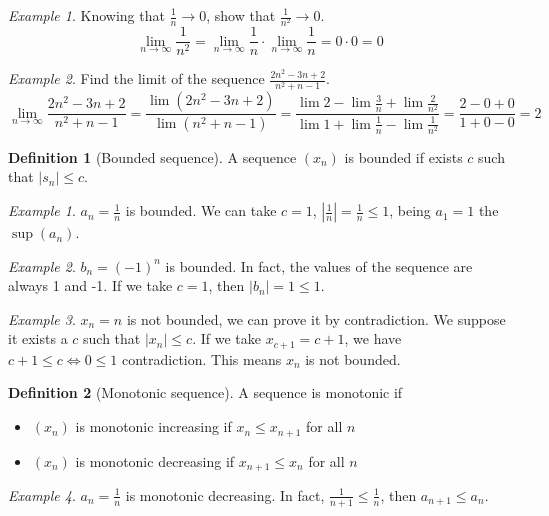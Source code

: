 \documentclass{article}
\newcommand{\abs}[1]{\left|#1\right|}
\newcommand{\fr}[2]{\frac{#1}{#2}}
\newcommand{\limn}{\lim_{n \to \infty}}
\theoremstyle{definition}
\newtheorem{definition}{Definition}[section]
\theoremstyle{definition}
\theoremstyle{plain}
\theoremstyle{plain}
\theoremstyle{plain}
\theoremstyle{plain}
\theoremstyle{definition}
\theoremstyle{remark}
\newtheorem{exampled}{Example}[definition]
\theoremstyle{remark}
\theoremstyle{remark}
\newtheorem{examplet}{Example}[theorem]
\theoremstyle{remark}
\begin{document}
\begin{examplet}
  Knowing that $\fr{1}{n} \to 0$, show that $\fr{1}{n^2} \to 0$.
  \[
  \limn \fr{1}{n^2} = \limn \fr{1}{n} \cdot \limn \fr{1}{n} = 0 \cdot 0 = 0
  \]
\end{examplet}

\begin{examplet}
  Find the limit of the sequence $\fr{2n^2 - 3n + 2}{n^2 + n -1}$.
  \[
  \limn \fr{2n^2 - 3n + 2}{n^2 + n -1} =
  \fr{\lim (2n^2 - 3n + 2)}{\lim (n^2 + n -1)} =
  \fr{\lim 2 - \lim \fr{3}{n} + \lim \fr{2}{n^2}}{\lim 1 +
    \lim \fr{1}{n} - \lim \fr{1}{n^2}} =
  \fr{2 - 0 + 0}{1 + 0 - 0} = 2
  \]
\end{examplet}


\begin{definition}[Bounded sequence]
  A sequence $(x_n)$ is bounded if exists $c$ such that $\abs{s_n} \leq c$.
\end{definition}

\begin{exampled}
  $a_n = \frac{1}{n}$ is bounded. We can take $c = 1$, $\abs{\frac{1}{n}} = \frac{1}{n} \leq 1$, being $a_1 = 1$ the $\sup(a_n)$.
\end{exampled}

\begin{exampled}
  $b_n = (-1)^n$ is bounded. In fact, the values of the sequence are always 1 and -1. If we take $c = 1$, then $\abs{b_n} = 1 \leq 1$.
\end{exampled}

\begin{exampled}
  $x_n = n$ is not bounded, we can prove it by contradiction. We suppose it exists a $c$ such that $\abs{x_n} \leq c$. If we take $x_{c+1} = c + 1$, we have $c + 1 \leq c \iff 0 \leq 1$ contradiction. This means $x_n$ is not bounded.
\end{exampled}


\begin{definition}[Monotonic sequence]
  A sequence is monotonic if
  \begin{itemize}
    \item $(x_n)$ is monotonic increasing if $x_n \leq x_{n+1}$ for all $n$
    \item $(x_n)$ is monotonic decreasing if $x_{n+1} \leq x_n$ for all $n$
  \end{itemize}
\end{definition}

\begin{exampled}
  $a_n = \fr{1}{n}$ is monotonic decreasing. In fact, $\fr{1}{n+1} \leq \fr{1}{n}$, then $a_{n+1} \leq a_n$.
\end{exampled}
\end{document}
